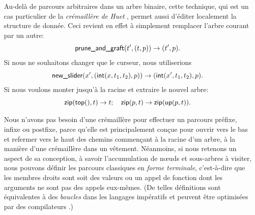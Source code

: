 Au-delà de parcours arbitraires dans un arbre binaire, cette
technique, qui est un cas particulier de la \emph{crémaillère de Huet}
\citep{Huet_1997}, permet aussi d'éditer localement la structure de
donnée.  Ceci revient en effet à simplement remplacer l'arbre courant
par un autre:
\begin{equation*}
\textsf{prune\_and\_graft}(t',({t},{p})) \rightarrow ({t'},{p}).
\end{equation*}
Si nous ne souhaitons changer que le curseur, nous utiliserions
\begin{equation*}
\textsf{new\_slider}(x',({\textsf{int}(x,t_1,t_2)},{p})) \rightarrow
({\textsf{int}(x',t_1,t_2)},{p}).
\end{equation*}
Si nous voulons monter jusqu'à la racine et extraire le nouvel arbre:
\begin{equation*}
\textsf{zip}(\textsf{top}(), t) \rightarrow t;\quad
\textsf{zip}(p, t) \rightarrow \textsf{zip}(\textsf{up}(p, t)).
\end{equation*}

Nous n'avons pas besoin d'une crémaillère pour effectuer un parcours préfixe, infixe ou
postfixe, parce qu'elle est principalement conçue pour ouvrir vers le
bas et refermer vers le haut des chemins commençant à la racine d'un
arbre, à la manière d'une crémaillère dans un vêtement. Néanmoins, si
nous retenons un aspect de sa conception, à savoir l'accumulation de
nœuds et sous-arbres à visiter, nous pouvons définir les parcours
classiques en \emph{forme terminale}, c'est-à-dire que les membres droits sont soit
des valeurs ou un appel de fonction dont les arguments ne sont pas des
appels eux-mêmes. (De telles définitions sont équivalentes à des
\emph{boucles} dans les langages impératifs et peuvent être optimisées
par des compilateurs \citep{Appel_1992}.)

